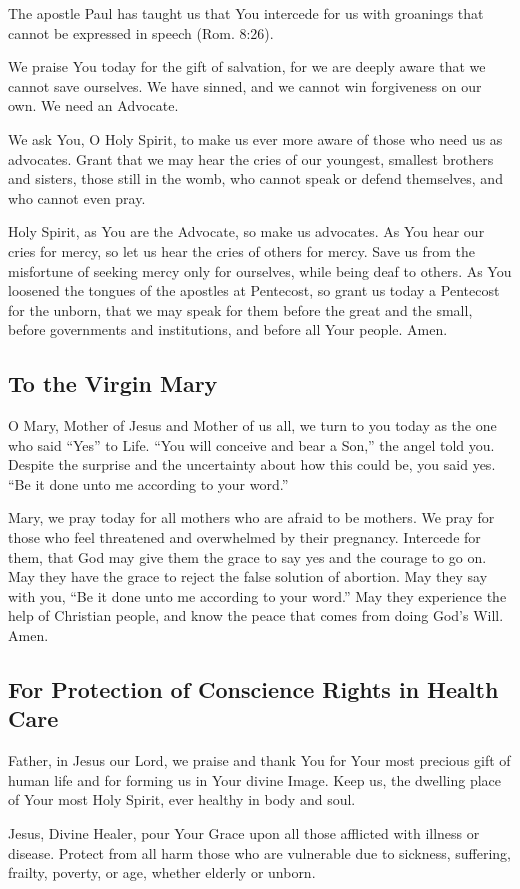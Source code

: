 \documentclass[12pt]{article}
\newcommand{\prayertitle}[1]{\subsection{#1}}
\begin{document}
The apostle Paul has taught us that You intercede for us with groanings that cannot be expressed in speech (Rom. 8:26).

We praise You today for the gift of salvation, for we are deeply aware that we cannot save ourselves.
We have sinned, and we cannot win forgiveness on our own.
We need an Advocate.

We ask You, O Holy Spirit, to make us ever more aware of those who need us as advocates.
Grant that we may hear the cries of our youngest, smallest brothers and sisters, those still in the womb, who cannot speak or defend themselves, and who cannot even pray.

Holy Spirit, as You are the Advocate, so make us advocates.
As You hear our cries for mercy, so let us hear the cries of others for mercy.
Save us from the misfortune of seeking mercy only for ourselves, while being deaf to others.
As You loosened the tongues of the apostles at Pentecost, so grant us today a Pentecost for the unborn, that we may speak for them before the great and the small, before governments and institutions, and before all Your people.
Amen.

\prayertitle{To the Virgin Mary}
O Mary, Mother of Jesus and Mother of us all, we turn to you today as the one who said ``Yes'' to Life.
``You will conceive and bear a Son,'' the angel told you.
Despite the surprise and the uncertainty about how this could be, you said yes.
``Be it done unto me according to your word.''

Mary, we pray today for all mothers who are afraid to be mothers.
We pray for those who feel threatened and overwhelmed by their pregnancy.
Intercede for them, that God may give them the grace to say yes and the courage to go on.
May they have the grace to reject the false solution of abortion.
May they say with you, ``Be it done unto me according to your word.''
May they experience the help of Christian people, and know the peace that comes from doing God's Will.
Amen.

\prayertitle{For Protection of Conscience Rights in Health Care}
Father, in Jesus our Lord, we praise and thank You for Your most precious gift of human life and for forming us in Your divine Image.
Keep us, the dwelling place of Your most Holy Spirit, ever healthy in body and soul.

Jesus, Divine Healer, pour Your Grace upon all those afflicted with illness or disease.
Protect from all harm those who are vulnerable due to sickness, suffering, frailty, poverty, or age, whether elderly or unborn.
\end{document}
